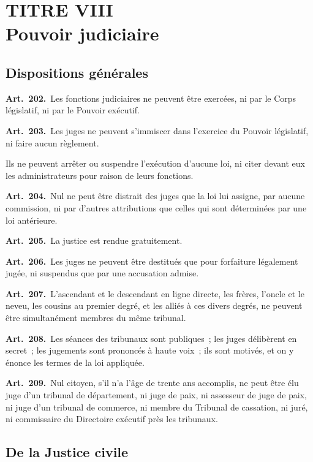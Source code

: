 \documentclass[french,twoside]{book} %
\newcommand{\labelchar}[1]{\textbf{\color{rubric} #1}}
\begin{document}
\section[{TITRE VIII. Pouvoir judiciaire}]{TITRE VIII \\
Pouvoir judiciaire}


\subsection[{Dispositions générales}]{Dispositions générales}

\labelchar{Art. 202.} Les fonctions judiciaires ne peuvent être exercées, ni par le Corps législatif, ni par le Pouvoir exécutif.\par
\labelchar{Art. 203.} Les juges ne peuvent s’immiscer dans l’exercice du Pouvoir législatif, ni faire aucun règlement.\par
Ils ne peuvent arrêter ou suspendre l’exécution d’aucune loi, ni citer devant eux les administrateurs pour raison de leurs fonctions.\par
\labelchar{Art. 204.} Nul ne peut être distrait des juges que la loi lui assigne, par aucune commission, ni par d’autres attributions que celles qui sont déterminées par une loi antérieure.\par
\labelchar{Art. 205.} La justice est rendue gratuitement.\par
\labelchar{Art. 206.} Les juges ne peuvent être destitués que pour forfaiture légalement jugée, ni suspendus que par une accusation admise.\par
\labelchar{Art. 207.} L’ascendant et le descendant en ligne directe, les frères, l’oncle et le neveu, les cousins au premier degré, et les alliés à ces divers degrés, ne peuvent être simultanément membres du même tribunal.\par
\labelchar{Art. 208.} Les séances des tribunaux sont publiques ; les juges délibèrent en secret ; les jugements sont prononcés à haute voix ; ils sont motivés, et on y énonce les termes de la loi appliquée.\par
\labelchar{Art. 209.} Nul citoyen, s’il n’a l’âge de trente ans accomplis, ne peut être élu juge d’un tribunal de département, ni juge de paix, ni assesseur de juge de paix, ni juge d’un tribunal de commerce, ni membre du Tribunal de cassation, ni juré, ni commissaire du Directoire exécutif près les tribunaux.

\subsection[{De la Justice civile}]{De la Justice civile}
\end{document}
